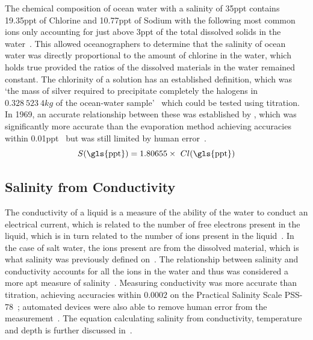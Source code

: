 The chemical composition of ocean water with a salinity of 35\gls{ppt} contains 19.35\gls{ppt} of Chlorine and 10.77\gls{ppt} of Sodium with the following most common ions only accounting for just above 3\gls{ppt} of the total dissolved solids in the water~\cite{britannica_seawater_encyclopaedia_2024}.
This allowed oceanographers to determine that the salinity of ocean water was directly proportional to the amount of chlorine in the water, which holds true provided the ratios of the dissolved materials in the water remained constant.
The chlorinity of a solution has an established definition, which was `the mass of silver required to precipitate completely the halogens in $0.328\ 523\ 4 kg$ of the ocean-water sample'~\cite{wooster_redefinition_of_salinity_1969} which could be tested using titration.
In 1969, an accurate relationship between these was established by , which was significantly more accurate than the evaporation method achieving accuracies within 0.01\gls{ppt}~\cite{sverdrup_ocean_physics_and_chemistry_1942} but was still limited by human error~\cite{lewis_salinity_definition_and_calculation_1978}.
\begin{equation}\label{eqn:salinity-chlorinity}
 S (\text{\gls{ppt}}) = 1.80655 \times~Cl (\text{\gls{ppt}})
\end{equation}

\subsection{Salinity from Conductivity}\label{subsec:salinity-from-conductivity}

The conductivity of a liquid is a measure of the ability of the water to conduct an electrical current, which is related to the number of free electrons present in the liquid, which is in turn related to the number of ions present in the liquid~\cite{stewart_introduction_to_physical_oceanography_2004}.
In the case of salt water, the ions present are from the dissolved material, which is what salinity was previously defined on~\cite{stewart_introduction_to_physical_oceanography_2004}.
The relationship between salinity and conductivity accounts for all the ions in the water and thus was considered a more apt measure of salinity~\cite{lewis_salinity_definition_and_calculation_1978}.
Measuring conductivity was more accurate than titration, achieving accuracies within $0.0002$ on the Practical Salinity Scale PSS-78~\cite{seabird_salinity_accuracy}; automated devices were also able to remove human error from the measurement~\cite{lewis_salinity_definition_and_calculation_1978}.
The equation calculating salinity from conductivity, temperature and depth is further discussed in~.

